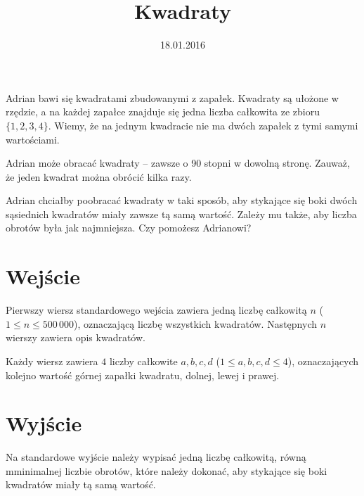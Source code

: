 \documentclass[zad,zawodnik,utf8]{sinol}
\title{Kwadraty}
\author{} %
\date{18.01.2016}
\begin{document}
  \begin{tasktext}%
Adrian bawi się kwadratami zbudowanymi z zapałek. Kwadraty są ułożone w rzędzie, a na każdej zapałce znajduje się jedna liczba całkowita ze zbioru $\{1, 2, 3, 4\}$. Wiemy, że na jednym kwadracie nie ma dwóch zapałek z tymi samymi wartościami.

Adrian może obracać kwadraty -- zawsze o 90 stopni w dowolną stronę. Zauważ, że jeden kwadrat można obrócić kilka razy.

Adrian chciałby poobracać kwadraty w taki sposób, aby stykające się boki dwóch sąsiednich kwadratów miały zawsze tą samą wartość. Zależy mu także, aby liczba obrotów była jak najmniejsza. Czy pomożesz Adrianowi?
 
  \section{Wejście}
 Pierwszy wiersz standardowego wejścia zawiera jedną liczbę całkowitą $n$ ($1 \leq n \leq 500\,000$), oznaczającą liczbę wszystkich kwadratów. Następnych $n$ wierszy zawiera opis kwadratów.

Każdy wiersz zawiera $4$ liczby całkowite $a, b, c, d$ ($1 \leq a, b, c, d \leq 4$), oznaczających kolejno wartość górnej zapałki kwadratu, dolnej, lewej i prawej.

  \section{Wyjście}
 Na standardowe wyjście należy wypisać jedną liczbę całkowitą, równą mminimalnej liczbie obrotów, które należy dokonać, aby stykające się boki kwadratów miały tą samą wartość. 

     \makestandardexample

  \end{tasktext}
\end{document}

